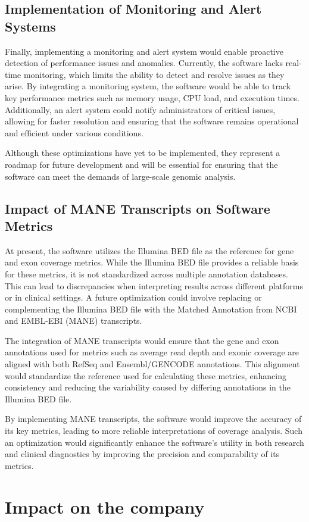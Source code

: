 \subsection{Implementation of Monitoring and Alert Systems}
Finally, implementing a monitoring and alert system would enable proactive detection of performance issues and anomalies. Currently, the software lacks real-time monitoring, which limits the ability to detect and resolve issues as they arise. By integrating a monitoring system, the software would be able to track key performance metrics such as memory usage, CPU load, and execution times. Additionally, an alert system could notify administrators of critical issues, allowing for faster resolution and ensuring that the software remains operational and efficient under various conditions.

Although these optimizations have yet to be implemented, they represent a roadmap for future development and will be essential for ensuring that the software can meet the demands of large-scale genomic analysis.

\subsection{Impact of MANE Transcripts on Software Metrics}
At present, the software utilizes the Illumina BED file as the reference for gene and exon coverage metrics. While the Illumina BED file provides a reliable basis for these metrics, it is not standardized across multiple annotation databases. This can lead to discrepancies when interpreting results across different platforms or in clinical settings. A future optimization could involve replacing or complementing the Illumina BED file with the Matched Annotation from NCBI and EMBL-EBI (MANE) transcripts. \cite{Morales2022}

The integration of MANE transcripts would ensure that the gene and exon annotations used for metrics such as average read depth and exonic coverage are aligned with both RefSeq and Ensembl/GENCODE annotations. This alignment would standardize the reference used for calculating these metrics, enhancing consistency and reducing the variability caused by differing annotations in the Illumina BED file. 

By implementing MANE transcripts, the software would improve the accuracy of its key metrics, leading to more reliable interpretations of coverage analysis. Such an optimization would significantly enhance the software's utility in both research and clinical diagnostics by improving the precision and comparability of its metrics. \cite{Morales2022}



\section{Impact on the company}